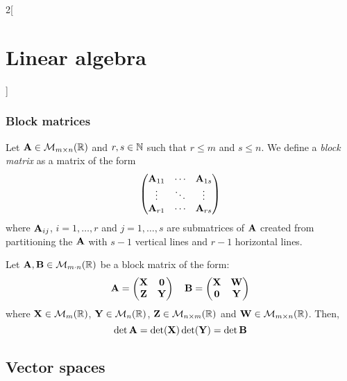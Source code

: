 \documentclass[../../../main.tex]{subfiles}
\begin{document}
\begin{multicols}{2}[\section{Linear algebra}]
  \subsubsection{Block matrices}
  \begin{definition}
    Let $\boldsymbol{\mathrm{A}}\in\mathcal{M}_{m\times n}(\mathbb{R})$ and $r,s\in\mathbb{N}$ such that $r\leq m$ and $s\leq n$. We define a \textit{block matrix} as a matrix of the form
    $$
      \begin{pmatrix}
        \boldsymbol{\mathrm{A}}_{11} & \cdots & \boldsymbol{\mathrm{A}}_{1s} \\
        \vdots                  & \ddots & \vdots                  \\
        \boldsymbol{\mathrm{A}}_{r1} & \cdots & \boldsymbol{\mathrm{A}}_{rs}
      \end{pmatrix}
    $$
    where $\boldsymbol{\mathrm{A}}_{ij}$, $i=1,\ldots,r$ and $j=1,\ldots,s$ are submatrices of $\boldsymbol{\mathrm{A}}$ created from partitioning the $\boldsymbol{\mathrm{A}}$ with $s-1$ vertical lines and $r-1$ horizontal lines.
  \end{definition}
  \begin{prop}
    Let $\boldsymbol{\mathrm{A}},\boldsymbol{\mathrm{B}}\in\mathcal{M}_{m\cdot n}(\mathbb{R})$ be a block matrix of the form:
    $$\boldsymbol{\mathrm{A}}=
      \begin{pmatrix}
        \boldsymbol{\mathrm{X}} & \boldsymbol{\mathrm{0}} \\
        \boldsymbol{\mathrm{Z}} & \boldsymbol{\mathrm{Y}}
      \end{pmatrix}\quad
      \boldsymbol{\mathrm{B}}=
      \begin{pmatrix}
        \boldsymbol{\mathrm{X}} & \boldsymbol{\mathrm{W}} \\
        \boldsymbol{\mathrm{0}} & \boldsymbol{\mathrm{Y}}
      \end{pmatrix}
    $$
    where $\boldsymbol{\mathrm{X}}\in\mathcal{M}_m(\mathbb{R})$, $\boldsymbol{\mathrm{Y}}\in\mathcal{M}_n(\mathbb{R})$, $\boldsymbol{\mathrm{Z}}\in\mathcal{M}_{n\times m}(\mathbb{R})$ and $\boldsymbol{\mathrm{W}}\in\mathcal{M}_{m\times n}(\mathbb{R})$. Then, $$\det\boldsymbol{\mathrm{A}}=\det(\boldsymbol{\mathrm{X}})\det(\boldsymbol{\mathrm{Y}})=\det\boldsymbol{\mathrm{B}}$$
  \end{prop}
  \subsection{Vector spaces}

\end{multicols}
\end{document}

